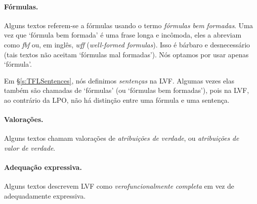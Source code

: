 
\paragraph{Fórmulas.} Alguns textos referem-se a fórmulas usando o termo \emph{fórmulas bem formadas}. Uma vez que `fórmula bem formada' é uma frase longa e incômoda, eles a abreviam como \emph{fbf} ou, em inglês, \emph{wff} (\emph{well-formed formulas}). Isso é bárbaro e desnecessário (tais textos não aceitam `fórmulas mal formadas'). Nós optamos por usar apenas `fórmula'.


Em \S\ref{s:TFLSentences}, nós definimos \emph{sentenças} na LVF. Algumas vezes elas também são chamadas de `fórmulas' (ou `fórmulas bem formadas'), pois na LVF, ao contrário da LPO, não há distinção entre uma fórmula e uma sentença. 

\paragraph{Valorações.} Alguns textos chamam valorações de \emph{atribuições de verdade}, ou \emph{atribuições de valor de verdade}.

\paragraph{Adequação expressiva.} Alguns textos descrevem LVF como \emph{verofuncionalmente completa} em vez de adequadamente expressiva.

